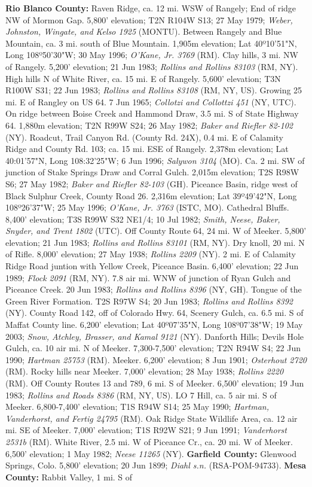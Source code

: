 \textbf{Rio Blanco County:} Raven Ridge, ca. 12 mi. WSW of Rangely; End of ridge NW of Mormon Gap. 5,800' elevation; T2N R104W S13; 27 May 1979; \textit{Weber, Johnston, Wingate, and Kelso 1925} (MONTU).  Between Rangely and Blue Mountain, ca. 3 mi. south of Blue Mountain. 1,905m elevation; Lat 40º10'51"N, Long 108º50'30"W; 30 May 1996; \textit{O'Kane, Jr. 3769} (RM).  Clay hills, 3 mi. NW of Rangely. 5,200' elevation; 21 Jun 1983; \textit{Rollins and Rollins 83103} (RM, NY).  High hills N of White River, ca. 15 mi. E of Rangely. 5,600' elevation; T3N R100W S31; 22 Jun 1983; \textit{Rollins and Rollins 83108} (RM, NY, US).  Growing 25 mi. E of Rangley on US 64. 7 Jun 1965; \textit{Collotzi and Collottzi 451} (NY, UTC).  On ridge between Boise Creek and Hammond Draw, 3.5 mi. S of State Highway 64. 1,880m elevation; T2N R99W S24; 26 May 1982; \textit{Baker and Riefler 82-102} (NY).  Roadcut, Trail Canyon Rd. (County Rd. 24X), 0.4 mi. E of Calamity Ridge and County Rd. 103; ca. 15 mi. ESE of Rangely. 2,378m elevation; Lat 40:01'57"N, Long 108:32'25"W; 6 Jun 1996; \textit{Salywon 3104} (MO).  Ca. 2 mi. SW of junction of Stake Springs Draw and Corral Gulch. 2,015m elevation; T2S R98W S6; 27 May 1982; \textit{Baker and Riefler 82-103} (GH).  Piceance Basin, ridge west of Black Sulphur Creek, County Road 26. 2,316m elevation; Lat 39º49'42"N, Long 108º26'37"W; 25 May 1996;  \textit{O'Kane, Jr. 3763} (ISTC, MO).  Cathedral Bluffs. 8,400' elevation; T3S R99W S32 NE1/4; 10 Jul 1982; \textit{Smith, Neese, Baker, Snyder, and Trent 1802} (UTC).  Off County Route 64, 24 mi. W of Meeker. 5,800' elevation; 21 Jun 1983; \textit{Rollins and Rollins 83101} (RM, NY).  Dry knoll, 20 mi. N of Rifle. 8,000' elevation; 27 May 1938; \textit{Rollins 2209} (NY).  2 mi. E of Calamity Ridge Road juntion with Yellow Creek, Piceance Basin. 6,400' elevation; 22 Jun 1989; \textit{Flock 2091} (RM, NY).  7.8 air mi. WNW of junction of Ryan Gulch and Piceance Creek. 20 Jun 1983; \textit{Rollins and Rollins 8396} (NY, GH).  Tongue of the Green River Formation. T2S R97W S4; 20 Jun 1983; \textit{Rollins and Rollins 8392} (NY).  County Road 142, off of Colorado Hwy. 64, Scenery Gulch, ca. 6.5 mi. S of Maffat County line. 6,200' elevation; Lat 40º07'35"N, Long 108º07'38"W; 19 May 2003; \textit{Snow, Atchley, Brasser, and Kamal 9121} (NY).  Danforth Hills; Devils Hole Gulch, ca. 10 air mi. N of Meeker.  7,300-7,500' elevation; T2N R94W S4; 22 Jun 1990; \textit{Hartman 25753} (RM).  Meeker. 6,200' elevation; 8 Jun 1901; \textit{Osterhout 2720} (RM).  Rocky hills near Meeker. 7,000' elevation; 28 May 1938; \textit{Rollins 2220} (RM).  Off County Routes 13 and 789, 6 mi. S of Meeker. 6,500' elevation; 19 Jun 1983; \textit{Rollins and Roads 8386} (RM, NY, US).  LO 7 Hill, ca. 5 air mi. S of Meeker. 6,800-7,400' elevation; T1S R94W S14; 25 May 1990; \textit{Hartman, Vanderhorst, and Fertig 24795} (RM).  Oak Ridge State Wildlife Area, ca. 12 air mi. SE of Meeker. 7,000' elevation; T1S R92W S21; 9 Jun 1991; \textit{Vanderhorst 2531b} (RM).  White River, 2.5 mi. W of Piceance Cr., ca. 20 mi. W of Meeker. 6,500' elevation; 1 May 1982; \textit{Neese 11265} (NY).  \textbf{Garfield County:} Glenwood Springs, Colo. 5,800' elevation; 20 Jun 1899; \textit{Diahl s.n.} (RSA-POM-94733).  \textbf{Mesa County:} Rabbit Valley, 1 mi. S of 